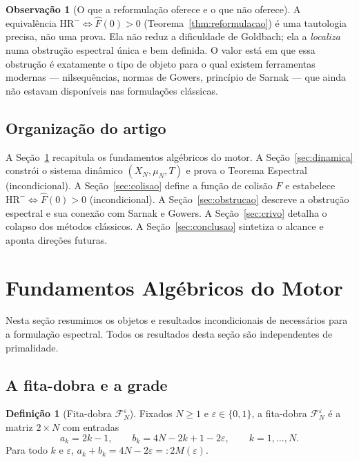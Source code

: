 \documentclass[12pt,a4paper]{article}
\theoremstyle{definition}
\newtheorem{definition}[theorem]{Definição}
\newtheorem{remark}[theorem]{Observação}
\newcommand{\F}{\mathcal{F}}           %
\newcommand{\HRm}{\mathrm{HR}^{-}}
\begin{document}
	\begin{remark}[O que a reformulação oferece e o que não oferece]
		\label{rem:honestidade}
		A equivalência $\HRm \Leftrightarrow \widehat{F}(0) > 0$
		(Teorema~\ref{thm:reformulacao}) é uma tautologia precisa, não uma
		prova. Ela não reduz a dificuldade de Goldbach; ela a \emph{localiza}
		numa obstrução espectral única e bem definida. O valor está em que essa
		obstrução é exatamente o tipo de objeto para o qual existem ferramentas
		modernas — nilsequências, normas de Gowers, princípio de Sarnak — que
		ainda não estavam disponíveis nas formulações clássicas.
	\end{remark}
	
	\subsection{Organização do artigo}
	
	A Seção~\ref{sec:fundamentos} recapitula os fundamentos algébricos do
	motor. A Seção~\ref{sec:dinamica} constrói o sistema dinâmico
	$(X_N, \mu_N, T)$ e prova o Teorema Espectral (incondicional).
	A Seção~\ref{sec:colisao} define a função de colisão $F$ e estabelece
	$\HRm \Leftrightarrow \widehat{F}(0) > 0$ (incondicional).
	A Seção~\ref{sec:obstrucao} descreve a obstrução espectral e sua conexão
	com Sarnak e Gowers. A Seção~\ref{sec:crivo} detalha o colapso dos
	métodos clássicos. A Seção~\ref{sec:conclusao} sintetiza o alcance e
	aponta direções futuras.
	
	\section{Fundamentos Algébricos do Motor}
	\label{sec:fundamentos}
	
	Nesta seção resumimos os objetos e resultados incondicionais de
	\cite{motor} necessários para a formulação espectral. Todos os resultados
	desta seção são independentes de primalidade.
	
	\subsection{A fita-dobra e a grade}
	
	\begin{definition}[Fita-dobra $\F_N^\varepsilon$]
		\label{def:fita}
		Fixados $N \geq 1$ e $\varepsilon \in \{0,1\}$, a fita-dobra
		$\F_N^\varepsilon$ é a matriz $2 \times N$ com entradas
		\[
		a_k = 2k - 1,\qquad b_k = 4N - 2k + 1 - 2\varepsilon,\qquad k = 1,\ldots,N.
		\]
		Para todo $k$ e $\varepsilon$, $a_k + b_k = 4N - 2\varepsilon =: 2M(\varepsilon)$.
	\end{definition}
	
\end{document}
